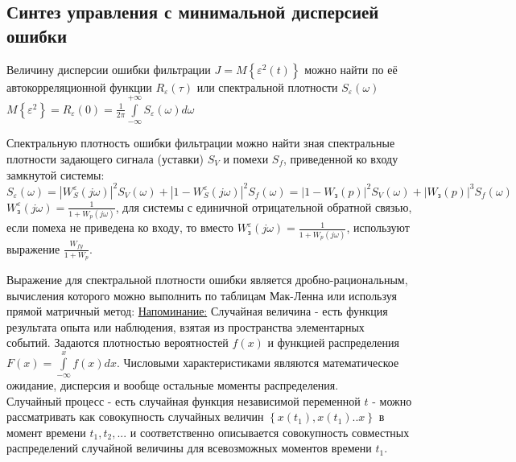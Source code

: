 \documentclass[preprint,russian,a5paper,10pt,twoside,mediummath]{ncc}
\begin{document}
	\subsection{Синтез управления с минимальной дисперсией ошибки\label{stochastic:min_error_dispersion}}
Величину дисперсии ошибки фильтрации $J=M\left\{ {{\varepsilon }^{2}}\left( t \right) \right\}$ можно найти по её автокорреляционной функции ${{R}_{\varepsilon }}\left( \tau  \right)$ или спектральной плотности ${{S}_{\varepsilon }}\left( \omega  \right)$
\\$M\left\{ {{\varepsilon }^{2}} \right\}={{R}_{\varepsilon }}\left( 0 \right)=\frac{1}{2\pi }\int\limits_{-\infty }^{+\infty }{{{S}_{\varepsilon }}\left( \omega  \right)d\omega }$
\par Спектральную плотность ошибки фильтрации можно найти зная спектральные плотности задающего сигнала (уставки) ${{S}_{V}}$ и помехи ${{S}_{f}}$, приведенной ко входу замкнутой системы:
${{S}_{\varepsilon }}\left( \omega  \right)={{\left| W_{S}^{\varepsilon }\left( j\omega  \right) \right|}^{2}}{{S}_{V}}\left( \omega  \right)+{{\left| 1-W_{S}^{\varepsilon }\left( j\omega  \right) \right|}^{2}}{{S}_{f}}\left( \omega  \right)={{\left| 1-{{W}_{\textit{з}}}\left( p \right) \right|}^{2}}{{S}_{V}}\left( \omega  \right)+{{\left| {{W}_{\textit{з}}}\left( p \right) \right|}^{3}}{{S}_{f}}\left( \omega  \right)$  
\\$W_{\textit{з}}^{\varepsilon }\left( j\omega  \right)=\frac{1}{1+{{W}_{p}}\left( j\omega  \right)}$, для системы с единичной отрицательной обратной связью, если помеха не приведена ко входу, то вместо $W_{\textit{з}}^{\varepsilon }\left( j\omega  \right)=\frac{1}{1+{{W}_{p}}\left( j\omega  \right)}$, используют выражение $\frac{{{W}_{fy}}}{1+{{W}_{p}}}$.
\par Выражение для спектральной плотности ошибки является дробно-рациональным, вычисления которого можно выполнить по таблицам Мак-Ленна или используя прямой матричный метод:
\underline{Напоминание:} Случайная величина - есть функция результата опыта или наблюдения, взятая из пространства элементарных событий. Задаются плотностью вероятностей $f\left( x \right)$ и функцией распределения $F\left( x \right)=\int\limits_{-\infty }^{x}{f\left( x \right)}dx$. Числовыми характеристиками являются математическое ожидание, дисперсия и вообще остальные моменты распределения.
\\Случайный процесс - есть случайная функция независимой переменной $t$ - можно рассматривать как совокупность случайных величин $\left\{ x\left( {{t}_{1}} \right),x\left( {{t}_{1}} \right)..x \right\}$ в момент времени ${{t}_{1}},{{t}_{2}},...$ и соответственно описывается совокупность совместных распределений случайной величины для всевозможных моментов времени ${{t}_{1}}$.
\end{document}
